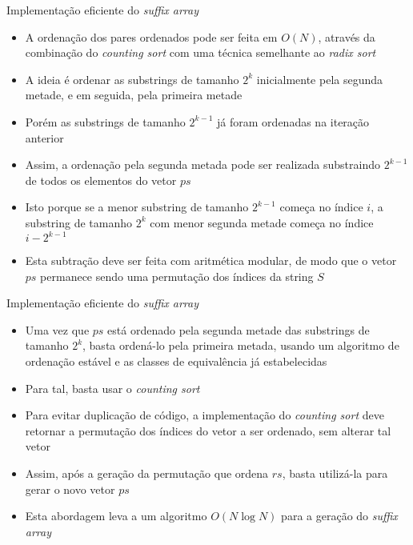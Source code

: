 \begin{frame}[fragile]{Implementação eficiente do {\it suffix array}}

    \begin{itemize}
        \item A ordenação dos pares ordenados pode ser feita em $O(N)$, através da combinação
            do {\it counting sort} com uma técnica semelhante ao {\it radix sort}

        \item A ideia é ordenar as substrings de tamanho $2^k$ inicialmente pela segunda metade, 
            e em seguida, pela primeira metade

        \item Porém as substrings de tamanho $2^{k - 1}$ já foram ordenadas na iteração anterior

        \item Assim, a ordenação pela segunda metada pode ser realizada substraindo
            $2^{k - 1}$ de todos os elementos do vetor $ps$

        \item Isto porque se a menor substring de tamanho $2^{k - 1}$ começa no índice $i$, a
            substring de tamanho $2^k$ com menor segunda metade começa no índice $i - 2^{k - 1}$

        \item Esta subtração deve ser feita com aritmética modular, de modo que o vetor $ps$
            permanece sendo uma permutação dos índices da string $S$
    \end{itemize}

\end{frame}

\begin{frame}[fragile]{Implementação eficiente do {\it suffix array}}

    \begin{itemize}
        \item Uma vez que $ps$ está ordenado pela segunda metade das substrings de tamanho $2^k$,
            basta ordená-lo pela primeira metada, usando um algoritmo de ordenação estável e 
            as classes de equivalência já estabelecidas

        \item Para tal, basta usar o \textit{counting sort}

        \item Para evitar duplicação de código, a implementação do \textit{counting sort} deve
            retornar a permutação dos índices do vetor a ser ordenado, sem alterar tal vetor

        \item Assim, após a geração da permutação que ordena $rs$, basta utilizá-la para gerar
            o novo vetor $ps$
                
        \item Esta abordagem leva a um algoritmo $O(N\log N)$ para a geração do \textit{suffix
            array}
    \end{itemize}

\end{frame}

